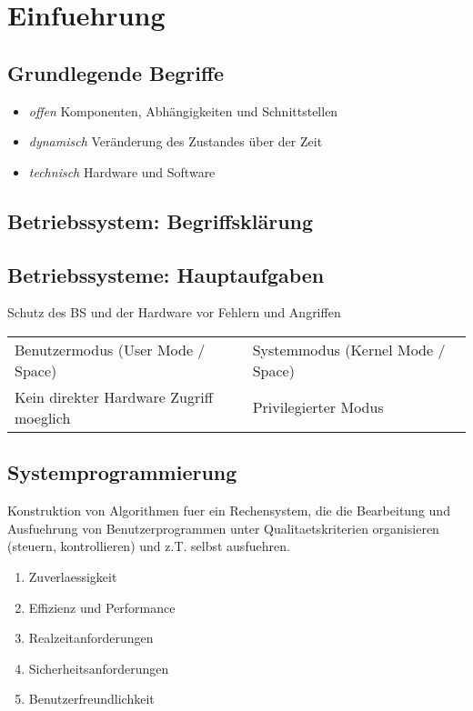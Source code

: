 \chapter{Einfuehrung}

\section{Grundlegende Begriffe}

\begin{itemize}
	\item \emph{offen} Komponenten, Abhängigkeiten und Schnittstellen
	\item \emph{dynamisch} Veränderung des Zustandes über der Zeit
	\item \emph{technisch} Hardware und Software
\end{itemize}


\section{Betriebssystem: Begriffsklärung}

\section{Betriebssysteme: Hauptaufgaben}
\noindent Schutz des BS und der Hardware vor Fehlern und Angriffen

\begin{longtable}{ll}
	Benutzermodus (User Mode / Space)& Systemmodus (Kernel Mode / Space)\\
	Kein direkter Hardware Zugriff moeglich& Privilegierter Modus\\ 
\end{longtable}


\section{Systemprogrammierung}

\noindent Konstruktion von Algorithmen fuer ein Rechensystem, die die Bearbeitung und Ausfuehrung von Benutzerprogrammen unter Qualitaetskriterien organisieren (steuern, kontrollieren) und z.T. selbst ausfuehren.

\begin{enumerate}
	\setlength\itemsep{0em}
	\item Zuverlaessigkeit
	\item Effizienz und Performance
	\item Realzeitanforderungen
	\item Sicherheitsanforderungen
	\item Benutzerfreundlichkeit
\end{enumerate}

